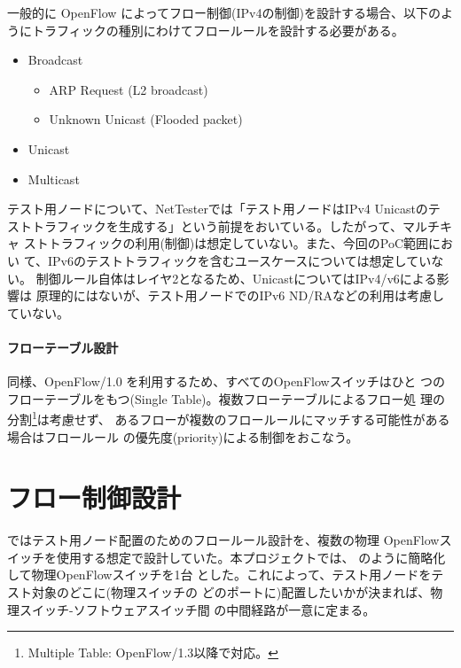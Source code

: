 一般的に OpenFlow によってフロー制御(IPv4の制御)を設計する場合、以下のよ
うにトラフィックの種別にわけてフロールールを設計する必要がある。
\begin{itemize}
 \item Broadcast
       \begin{itemize}
        \item ARP Request (L2 broadcast)
        \item Unknown Unicast (Flooded packet)
       \end{itemize}
 \item Unicast
 \item Multicast
\end{itemize}

テスト用ノードについて、NetTesterでは「テスト用ノードはIPv4 Unicastのテ
ストトラフィックを生成する」という前提をおいている。したがって、マルチキャ
ストトラフィックの利用(制御)は想定していない。また、今回のPoC範囲におい
て、IPv6のテストトラフィックを含むユースケースについては想定していない。
制御ルール自体はレイヤ2となるため、UnicastについてはIPv4/v6による影響は
原理的にはないが、テスト用ノードでのIPv6 ND/RAなどの利用は考慮していない。

    \paragraph{フローテーブル設計}

\lopjc 同様、OpenFlow/1.0 を利用するため、すべてのOpenFlowスイッチはひと
つのフローテーブルをもつ(Single Table)。複数フローテーブルによるフロー処
理の分割\footnote{Multiple Table: OpenFlow/1.3以降で対応。}は考慮せず、
あるフローが複数のフロールールにマッチする可能性がある場合はフロールール
の優先度(priority)による制御をおこなう。

 \section{フロー制御設計}
 \label{sec:flow-design}

\lopjc ではテスト用ノード配置のためのフロールール設計を、複数の物理
OpenFlowスイッチを使用する想定で設計していた。本プロジェクトでは、
のように簡略化して物理OpenFlowスイッチを1台
とした。これによって、テスト用ノードをテスト対象のどこに(物理スイッチの
どのポートに)配置したいかが決まれば、物理スイッチ-ソフトウェアスイッチ間
の中間経路が一意に定まる。


